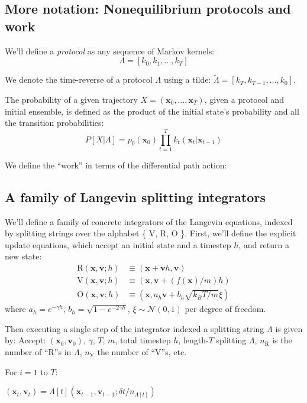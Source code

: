 \documentclass[11pt]{article}
\newcommand{\x}{\mathbf{x}}
\newcommand{\vel}{\mathbf{v}}
\begin{document}
\subsection{More notation: Nonequilibrium protocols and work}
We'll define a \emph{protocol} as any sequence of Markov kernels: $$\Lambda=[k_0, k_1, \dots, k_T]$$

We denote the time-reverse of a protocol $\Lambda$ using a tilde: $\tilde{\Lambda} = [k_T, k_{T-1}, \dots, k_0]$.

The probability of a given trajectory $X = (\x_0, \dots, \x_T)$, given a protocol and initial ensemble, is defined as the product of the initial state's probability and all the transition probabilities:
$$P[X | \Lambda] = p_0 (\x_0) \prod_{t=1}^T k_t(\x_t | \x_{t-1})$$

We define the ``work'' in terms of the differential path action:



\subsection{A family of Langevin splitting integrators}
We'll define a family of concrete integrators of the Langevin equations, indexed by splitting strings over the alphabet \{ V, R, O \}.
First, we'll define the explicit update equations, which accept an initial state and a timestep $h$, and return a new state:
$$\begin{aligned}
\text{R}(\x, \vel ; h) &\equiv (\x + \vel h, \vel) \\
\text{V}(\x, \vel ; h) &\equiv (\x, \vel + (f(\x) / m) h) \\
\text{O}(\x, \vel ; h) &\equiv (\x, a_h \vel + b_h \sqrt{k_B T / m} \xi)\end{aligned}$$
where $a_h = e^{-\gamma h}$,
$b_h = \sqrt{1 - e^{-2 \gamma h}}$,
$\xi \sim \mathcal{N}(0, 1)$ per degree of freedom.

Then executing a single step of the integrator indexed a splitting string $\Lambda$ is given by:
Accept: $(\x_0, \vel_0)$, $\gamma$, $T$, $m$, total timestep $h$, length-$T$ splitting $\Lambda$,
$n_\text{R}$ is the number of ``R''s in $\Lambda$, $n_\text{V}$ the number of ``V''s, etc.

For $i=1$ to $T$:

$(\x_t, \vel_t) = \Lambda[t](\x_{t-1}, \vel_{t-1} ; \delta t / n_{\Lambda[t]}) $
\end{document}
